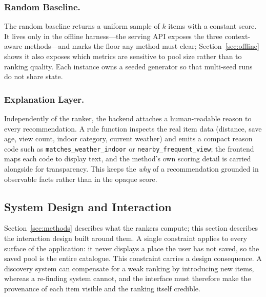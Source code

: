 \documentclass[acmlarge]{acmart}
\begin{document}
\subsubsection{Random Baseline.}
The random baseline returns a uniform sample of $k$ items with a constant
score. It lives only in the offline harness---the serving API exposes the
three context-aware methods---and marks the floor any method must clear;
Section~\ref{sec:offline} shows it also exposes which metrics are
sensitive to pool size rather than to ranking quality. Each instance owns
a seeded generator so that multi-seed runs do not share state.

\subsubsection{Explanation Layer.}
Independently of the ranker, the backend attaches a human-readable reason
to every recommendation. A rule function inspects the real item data
(distance, save age, view count, indoor category, current weather) and
emits a compact reason code such as \texttt{matches\_weather\_indoor} or
\texttt{nearby\_frequent\_view}; the frontend maps each code to display
text, and the method's own scoring detail is carried alongside for
transparency. This keeps the \emph{why} of a recommendation grounded in
observable facts rather than in the opaque score.

\subsection{System Design and Interaction}
\label{sec:system-design}

Section~\ref{sec:methods} describes what the rankers compute; this section
describes the interaction design built around them. A single constraint
applies to every surface of the application: it never displays a place the
user has not saved, so the saved pool is the entire catalogue. This
constraint carries a design consequence. A discovery system can compensate
for a weak ranking by introducing new items, whereas a re-finding system
cannot, and the interface must therefore make the provenance of each item
visible and the ranking itself credible.
\end{document}
